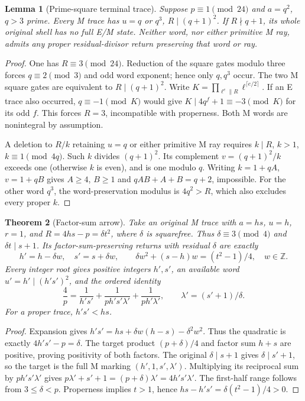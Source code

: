 \documentclass[10pt,reqno]{amsart}
\newtheorem{theorem}{Theorem}\newtheorem{lemma}[theorem]{Lemma}
\begin{document}
\begin{lemma}[Prime-square terminal trace]
Suppose $p\equiv1\pmod{24}$ and $a=q^2$, $q>3$ prime. Every M trace has
$u=q$ or $q^3$, $R\mid(q+1)^2$. If $R\nmid q+1$, its whole original shell
has no full E/M state. Neither word, nor either primitive M ray, admits any
proper residual-divisor return preserving that word or ray.
\end{lemma}
\begin{proof}
One has $R\equiv3\pmod{24}$. Reduction of the square gates modulo three forces
$q\equiv2\pmod3$ and odd word exponent; hence only $q,q^3$ occur. The two
M square gates are equivalent to $R\mid(q+1)^2$.
Write $K=\prod_{\ell^e\parallel R}\ell^{\lceil e/2\rceil}$.
If an E trace also occurred, $q\equiv-1\pmod K$ would give
$K\mid4q^f+1\equiv-3\pmod K$ for its odd $f$. This forces $R=3$,
incompatible with properness. Both M words are nonintegral by assumption.

A deletion to $R/k$ retaining $u=q$ or either primitive M ray requires
$k\mid R$, $k>1$, $k\equiv1\pmod{4q}$. Such $k$ divides $(q+1)^2$.
Its complement $v=(q+1)^2/k$ exceeds one (otherwise $k$ is even), and is
one modulo $q$. Writing $k=1+qA$, $v=1+qB$ gives $A\ge4$, $B\ge1$ and
$qAB+A+B=q+2$, impossible. For the other word $q^3$, the word-preservation
modulus is $4q^2>R$, which also excludes every proper $k$.
\end{proof}

\begin{theorem}[Factor-sum arrow]
Take an original M trace with $a=hs$, $u=h$, $r=1$, and
$R=4hs-p=\delta t^2$, where $\delta$ is squarefree. Thus
$\delta\equiv3\pmod4$ and $\delta t\mid s+1$.
Its factor-sum-preserving returns with residual $\delta$ are exactly
\[
 h'=h-\delta w,\quad s'=s+\delta w,\qquad
 \delta w^2+(s-h)w=(t^2-1)/4,\quad w\in\mathbb Z.
\]
Every integer root gives positive integers $h',s'$, an available word
$u'=h'\mid(h's')^2$, and the ordered identity
\[
 \boxed{\frac4p=\frac1{h's'}+
 \frac1{ph's'\lambda'}+\frac1{ph'\lambda'},\qquad
 \lambda'=(s'+1)/\delta.}
\]
For a proper trace, $h's'<hs$.
\end{theorem}
\begin{proof}
Expansion gives
$h's'=hs+\delta w(h-s)-\delta^2w^2$.
Thus the quadratic is exactly $4h's'-p=\delta$.
The target product $(p+\delta)/4$ and factor sum $h+s$ are positive, proving
positivity of both factors. The original $
\delta\mid s+1$ gives $\delta\mid s'+1$, so the target is the full M marking
$(h',1,s',\lambda')$. Multiplying its reciprocal sum by $ph's'\lambda'$
gives $p\lambda'+s'+1=(p+\delta)\lambda'=4h's'\lambda'$.
The first-half range follows from $3\le\delta<p$.
Properness implies $t>1$, hence $hs-h's'=\delta(t^2-1)/4>0$.
\end{proof}
\end{document}
